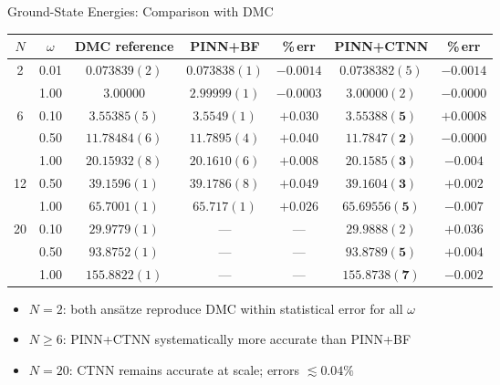 \documentclass[aspectratio=169,10pt]{beamer}
\begin{document}
\begin{frame}{Ground-State Energies: Comparison with DMC}
  \scriptsize
  \renewcommand{\arraystretch}{1.20}
  \begin{tabular}{c|c|c|cc|cc}
    \toprule
    $N$ & $\omega$ & DMC reference & PINN+BF & \%\,err & PINN+CTNN & \%\,err \\
    \midrule
    2 & 0.01  & $0.073839(2)$  & $0.073838(1)$ & $-0.0014$ & $0.0738382(5)$ & $-0.0014$ \\
      & 1.00  & $3.00000$      & $2.99999(1)$  & $-0.0003$ & $3.00000(2)$   & $-0.0000$ \\
    \midrule
    6 & 0.10  & $3.55385(5)$   & $3.5549(1)$   & $+0.030$  & $\mathbf{3.55388(5)}$ & $+0.0008$ \\
      & 0.50  & $11.78484(6)$  & $11.7895(4)$  & $+0.040$  & $\mathbf{11.7847(2)}$ & $-0.0000$ \\
      & 1.00  & $20.15932(8)$  & $20.1610(6)$  & $+0.008$  & $\mathbf{20.1585(3)}$ & $-0.004$  \\
    \midrule
    12& 0.50  & $39.1596(1)$   & $39.1786(8)$  & $+0.049$  & $\mathbf{39.1604(3)}$ & $+0.002$  \\
      & 1.00  & $65.7001(1)$   & $65.717(1)$   & $+0.026$  & $\mathbf{65.69556(5)}$& $-0.007$  \\
    \midrule
    20& 0.10  & $29.9779(1)$   & ---           & ---       & $29.9888(2)$          & $+0.036$  \\
      & 0.50  & $93.8752(1)$   & ---           & ---       & $\mathbf{93.8789(5)}$ & $+0.004$  \\
      & 1.00  & $155.8822(1)$  & ---           & ---       & $\mathbf{155.8738(7)}$& $-0.002$  \\
    \bottomrule
  \end{tabular}
  \normalsize

  \vspace{0.25cm}
  \begin{itemize}
    \item $N=2$: both ans\"atze reproduce DMC within statistical error for
          all $\omega$
    \item $N\ge6$: PINN+CTNN systematically more accurate than PINN+BF
    \item $N=20$: CTNN remains accurate at scale; errors $\lesssim 0.04\%$
  \end{itemize}
\end{frame}
\end{document}

